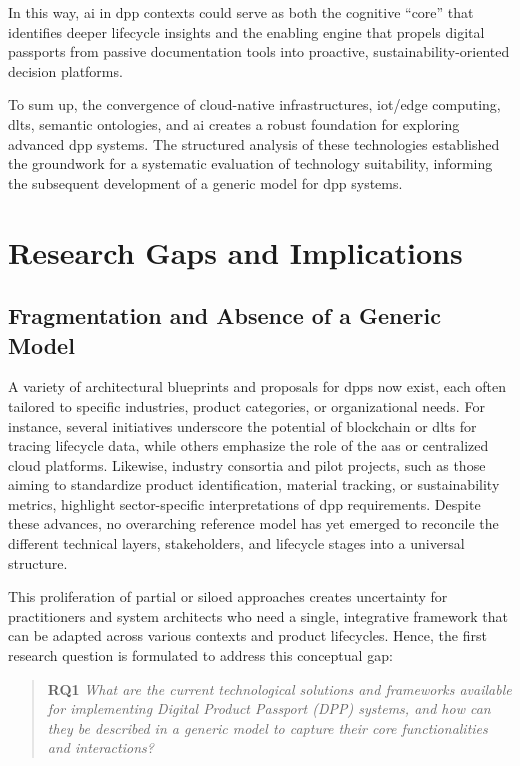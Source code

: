 In this way, \ac{ai} in \ac{dpp} contexts could serve as both the cognitive “core” that identifies deeper lifecycle insights and the enabling engine that propels digital passports from passive documentation tools into proactive, sustainability-oriented decision platforms.

To sum up, the convergence of cloud-native infrastructures, \ac{iot}/edge computing, \ac{dlt}s, semantic ontologies, and \ac{ai} creates a robust foundation for exploring advanced \ac{dpp} systems. The structured analysis of these technologies established the groundwork for a systematic evaluation of technology suitability, informing the subsequent development of a generic model for \ac{dpp} systems.

\section{Research Gaps and Implications}
\label{sec:research_gaps}

\subsection*{Fragmentation and Absence of a Generic Model}
A variety of architectural blueprints and proposals for \ac{dpp}s now exist, each often tailored to specific industries, product categories, or organizational needs. For instance, several initiatives underscore the potential of blockchain or \ac{dlt}s for tracing lifecycle data, while others emphasize the role of the \acrlong{aas} or centralized cloud platforms. Likewise, industry consortia and pilot projects, such as those aiming to standardize product identification, material tracking, or sustainability metrics, highlight sector-specific interpretations of \ac{dpp} requirements. Despite these advances, no overarching reference model has yet emerged to reconcile the different technical layers, stakeholders, and lifecycle stages into a universal structure.

This proliferation of partial or siloed approaches creates uncertainty for practitioners and system architects who need a single, integrative framework that can be adapted across various contexts and product lifecycles. Hence, the first research question is formulated to address this conceptual gap:

\begin{quote}
    \textbf{RQ1} \textit{What are the current technological solutions and frameworks available for implementing Digital Product Passport (DPP) systems, and how can they be described in a generic model to capture their core functionalities and interactions?}
\end{quote}

